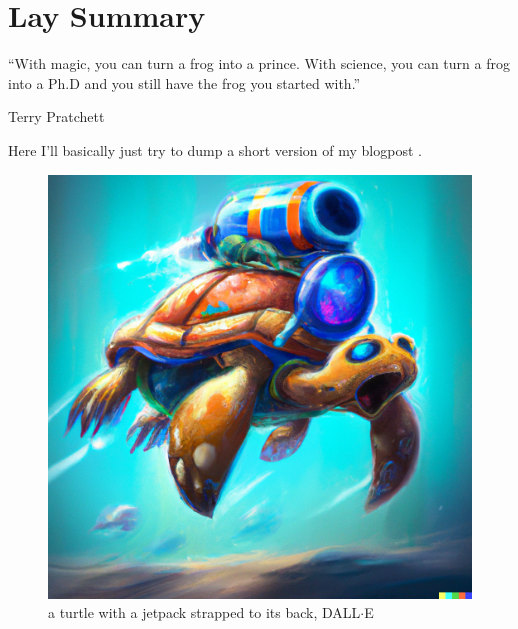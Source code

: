 \chapter{Lay Summary}
\epigraph{“With magic, you can turn a frog into a prince. With science, you can turn a frog into a Ph.D and you still have the frog you started with.”}{Terry Pratchett}

Here I'll basically just try to dump a short version of my blogpost \cite{cepaite_cold_2023}. 
\begin{figure}
\centering
\includegraphics[width=0.9\linewidth]{images/COLD_turle.png} \caption{a turtle with a jetpack strapped to its back, DALL$\cdot$E}\label{fig:COLD_TURTLE}
\end{figure}
